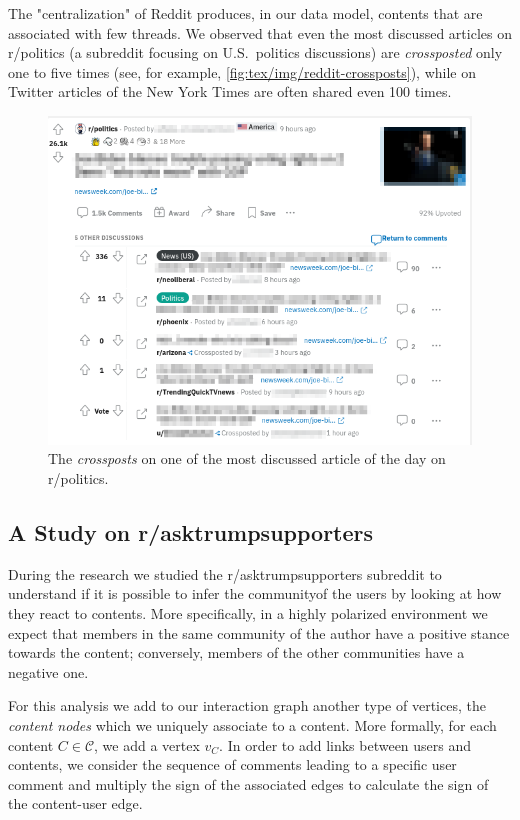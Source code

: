 The "centralization" of Reddit produces, in our data model, contents that are
associated with few threads. We observed that even the most discussed articles
on r/politics (a subreddit focusing on U.S.\ politics discussions) are
\emph{crossposted} only one to five times (see, for example,
\autoref{fig:tex/img/reddit-crossposts}), while on Twitter articles of the New York Times are
often shared even 100 times.

\begin{figure}
	\centering
	\includegraphics[width=0.8\linewidth]{tex/img/reddit-crossposts.png}
	\caption{The \emph{crossposts} on one of the most discussed article of the
		day on r/politics.}%
	\label{fig:tex/img/reddit-crossposts}
\end{figure}

\subsection{A Study on r/asktrumpsupporters}%
\label{sec:the_r_asktrumpsupporters_case}

During the research we studied the r/asktrumpsupporters subreddit to
understand if it is possible to infer the community\footnotemark of the users by
looking at how they react to contents. More specifically, in a highly polarized
environment we expect that members in the same community of the
author have a positive stance towards the content; conversely, members of the
other communities have a negative one.


\bigskip

For this analysis we add to our interaction graph another type of vertices, the
\emph{content nodes} which we uniquely associate to a content. More formally,
for each content $C \in \mathcal{C} $, we add a vertex $v_C$. In order to
add links between users and contents, we consider the sequence of comments
leading to a specific user comment and multiply the sign of the
associated edges to calculate the sign of the content-user edge.

